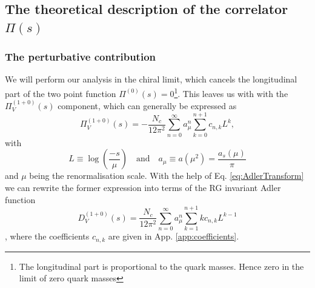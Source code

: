 \subsection{The theoretical description of the correlator $\Pi(s)$}
\subsubsection{The perturbative contribution}
We will perform our analysis in the chiral limit, which cancels the longitudinal part of the two point function $\Pi^{(0)}(s) = 0$\footnote{The longitudinal part is proportional to the quark masses. Hence zero in the limit of zero quark masses}. This leaves us with with the $\Pi_V^{(1+0)}(s)$ component, which can generally be expressed as \cite{Jamin2008}
\begin{equation}
	\Pi^{(1+0)}_V (s) = - \frac{N_c}{12 \pi^2} \sum_{n=0}^{\infty} a_\mu^n \sum_{k=0}^{n+1} c_{n,k} L^k,
\end{equation}
with
\begin{equation}
	L\equiv\log\left(\frac{-s}{\mu}\right) \quad \text{and} \quad a_\mu \equiv a(\mu^2) = \frac{a_s(\mu)}{\pi}
\end{equation}
and $\mu$ being the renormalisation scale.
With the help of Eq. \eqref{eq:AdlerTransform} we can rewrite the former expression into terms of the RG invariant Adler function
\begin{equation}
	D_V^{(1+0)} (s) = \frac{N_c}{12 \pi^2} \sum_{n=0}^\infty a_\mu^n \sum_{k=1}^{n+1} k c_{n,k} L^{k-1}
\end{equation},
where the coefficients $c_{n,k}$ are given in App. \ref{app:coefficients}.